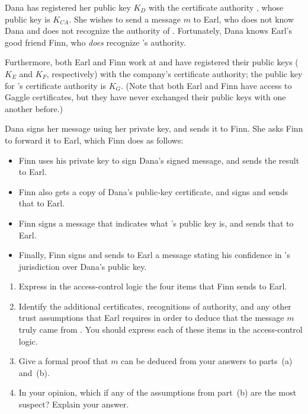 \begin{exercise}[\synthesis]
  Dana has registered her public key $K_D$ with the certificate
  authority , whose public key is $K_\mathit{CA}$. She wishes
  to send a message $m$ to Earl, who does not know Dana and does not
  recognize the authority of .  Fortunately, Dana knows Earl's
  good friend Finn, who \emph{does} recognize 's authority.
  
  Furthermore, both Earl and Finn work at  and have
  registered their public keys ($K_E$ and $K_F$, respectively) with the
  company's certificate authority; the public key for 's
  certificate authority is $K_G$.  (Note that both Earl and Finn have
  access to Gaggle certificates, but they have never exchanged their
  public keys with one another before.)

  Dana signs her message using her private key, and sends it to
  Finn.  She asks Finn to forward it to Earl, which Finn does as
  follows: 
  \begin{itemize}
  \item Finn uses his private key to sign Dana's signed message, and
    sends the result to Earl.
  \item Finn also gets a copy of Dana's public-key certificate, and
    signs and sends that to Earl.
  \item Finn signs a message that indicates what 's public
    key is, and sends that to Earl.
  \item Finally, Finn signs and sends to Earl a message stating his
    confidence in 's jurisdiction over Dana's public key.
  \end{itemize}

  \begin{enumerate}
  \item Express in the access-control logic the four items that Finn
    sends to Earl.
  \item Identify the additional certificates, recognitions of authority,
    and any other trust assumptions that Earl requires in order to
    deduce that the message $m$ truly came from .  You
    should express each of these items in the access-control logic.
  \item Give a formal proof that $m$ can be deduced from your answers to
    parts~(a) and~(b).
  \item In your opinion, which if any of the assumptions from part~(b)
    are the most suspect?  Explain your answer.   

  \end{enumerate}
\end{exercise}

